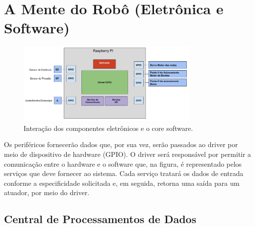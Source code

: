 \section{A Mente do Robô (Eletrônica e Software)}
\par
\begin{figure}[h]
  \centering
  \includegraphics[width=0.8\textwidth]{figures/schema-eletro-soft.png}
  \caption{Interação dos componentes eletrônicos e o core software.}
  \label{fig:schema-eletro-soft}
\end{figure}
\FloatBarrier
\par
Os periféricos fornecerão dados que, por sua vez, serão passados ao driver por meio de dispositivo de hardware (GPIO).  O driver será responsável por permitir a comunicação entre o hardware e o software que, na figura, é representado pelos serviços que deve fornecer ao sistema. Cada serviço tratará os dados de entrada conforme a especificidade solicitada e, em seguida, retorna uma saída para um atuador, por meio do driver.

\subsection{Central de Processamentos de Dados}
